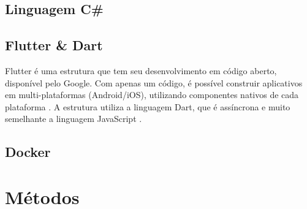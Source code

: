 \subsection{Linguagem C{\#}}\label{subsec:csharp}

\subsection{Flutter {\&} Dart}\label{subsec:flutterdart}
Flutter é uma estrutura que tem seu desenvolvimento em código aberto, disponível pelo Google. Com apenas um código, é possível construir 
aplicativos em multi-plataformas (Android/iOS), utilizando componentes nativos de cada plataforma \cite{Flutter}. A estrutura utiliza a linguagem Dart,
que é assíncrona e muito semelhante a linguagem JavaScript \cite{Dart}.

\subsection{Docker}\label{subsec:docker}

\section{Métodos}\label{sec:metodo}





